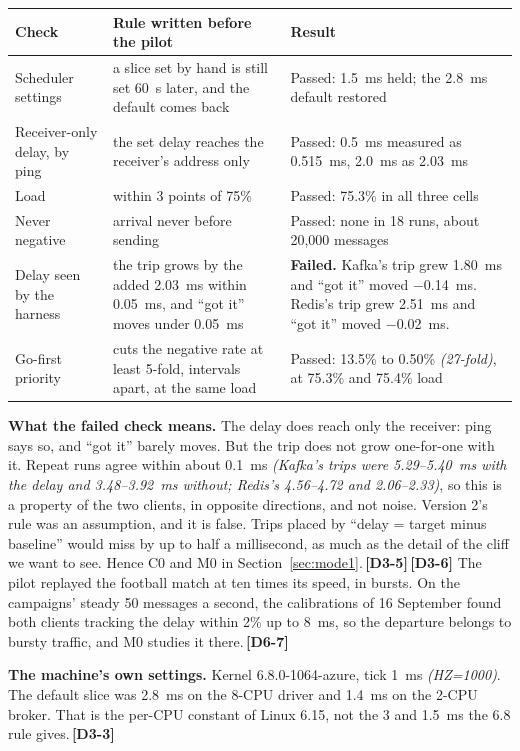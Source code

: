 \documentclass[11pt]{article}
\newcommand{\gl}[1]{{\color{soft}\itshape\small (#1)}}
\newcommand{\chgold}[1]{\,{\color{oldcol}\bfseries\footnotesize[#1]}}
\begin{document}
{\small
\begin{tabularx}{\linewidth}{@{}>{\raggedright\arraybackslash}p{3.0cm} >{\raggedright\arraybackslash}X >{\raggedright\arraybackslash}p{6.2cm}@{}}
\toprule
\textbf{Check} & \textbf{Rule written before the pilot} & \textbf{Result} \\
\midrule
Scheduler settings & a slice set by hand is still set 60~s later, and the default comes back & Passed: 1.5~ms held; the 2.8~ms default restored \\
Receiver-only delay, by ping & the set delay reaches the receiver's address only & Passed: 0.5~ms measured as 0.515~ms, 2.0~ms as 2.03~ms \\
Load & within 3 points of 75\% & Passed: 75.3\% in all three cells \\
Never negative & arrival never before sending & Passed: none in 18 runs, about 20,000 messages \\
Delay seen by the harness & the trip grows by the added 2.03~ms within 0.05~ms, and ``got it'' moves under 0.05~ms & \textbf{Failed.} Kafka's trip grew 1.80~ms and ``got it'' moved $-$0.14~ms. Redis's trip grew 2.51~ms and ``got it'' moved $-$0.02~ms. \\
Go-first priority & cuts the negative rate at least 5-fold, intervals apart, at the same load & Passed: 13.5\% to 0.50\% \gl{27-fold}, at 75.3\% and 75.4\% load \\
\bottomrule
\end{tabularx}}

\textbf{What the failed check means.} The delay does reach only the receiver: ping says so, and ``got it'' barely moves. But the trip does not grow one-for-one with it. Repeat runs agree within about 0.1~ms \gl{Kafka's trips were 5.29--5.40~ms with the delay and 3.48--3.92~ms without; Redis's 4.56--4.72 and 2.06--2.33}, so this is a property of the two clients, in opposite directions, and not noise. Version 2's rule was an assumption, and it is false. Trips placed by ``delay = target minus baseline'' would miss by up to half a millisecond, as much as the detail of the cliff we want to see. Hence C0 and M0 in Section~\ref{sec:mode1}.\chgold{D3-5}\chgold{D3-6} The pilot replayed the football match at ten times its speed, in bursts. On the campaigns' steady 50 messages a second, the calibrations of 16 September found both clients tracking the delay within 2\% up to 8~ms, so the departure belongs to bursty traffic, and M0 studies it there.\chgold{D6-7}

\textbf{The machine's own settings.} Kernel 6.8.0-1064-azure, tick 1~ms \gl{HZ=1000}. The default slice was 2.8~ms on the 8-CPU driver and 1.4~ms on the 2-CPU broker. That is the per-CPU constant of Linux 6.15, not the 3 and 1.5~ms the 6.8 rule gives.\chgold{D3-3}
\end{document}
